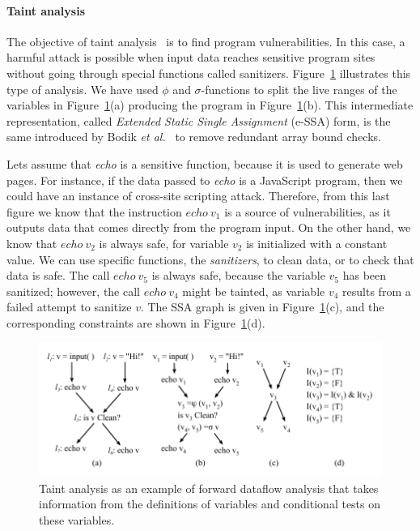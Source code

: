 \paragraph{Taint analysis}
The objective of taint analysis~\cite{Rimsa11} is to find program
vulnerabilities.
In this case, a harmful attack is possible when input data reaches sensitive
program sites without going through special functions called sanitizers.
Figure~\ref{fig:taintAnalysis} illustrates this type of analysis.
We have used $\phi$ and $\sigma$-functions to split the live ranges of the
variables in Figure~\ref{fig:taintAnalysis}(a) producing the program in
Figure~\ref{fig:taintAnalysis}(b).
This intermediate representation, called {\em Extended Static Single
Assignment} (e-SSA) form, is the same introduced by Bodik
{\em et al.}~\cite{Bodik00} to remove redundant array bound checks.

Lets assume that {\em echo} is a sensitive function, because it is used to
generate web pages.
For instance, if the data passed to {\em echo} is a JavaScript program, then
we could have an instance of cross-site scripting attack.
Therefore, from this last figure we know that the instruction
$\mathit{echo} \ v_1$ is a source of vulnerabilities, as it outputs data that
comes directly from the program input.
On the other hand, we know that $\mathit{echo} \ v_2$ is always safe, for
variable $v_2$ is initialized with a constant value.
We can use specific functions, the {\em sanitizers}, to clean data, or to
check that data is safe.
The call $\mathit{echo} \ v_5$ is always safe, because the variable $v_5$
has been sanitized; however, the call $\mathit{echo} \ v_4$ might be
tainted, as variable $v_4$ results from a failed attempt to sanitize $v$.
The SSA graph is given in Figure~\ref{fig:taintAnalysis}(c), and the
corresponding constraints are shown in Figure~\ref{fig:taintAnalysis}(d).

\begin{figure}[t!]
\centering
\includegraphics[width=\linewidth]{taintAnalysis}
\caption{Taint analysis as an example of forward dataflow analysis that takes
information from the definitions of variables and conditional tests on these
variables.}
\label{fig:taintAnalysis}
\end{figure}

